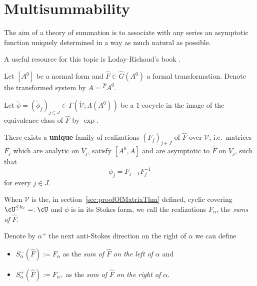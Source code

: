 \chapter{Multisummability}\label{chap:multisummability}
\begin{comment}
  \cite[Sec.III.2]{Loday2014},
  \cite[Chap.6]{Loday2014} and
  \cite[Chap.8]{Loday2014}
\end{comment}
The aim of a theory of summation is  to associate with any series an asymptotic
function uniquely determined in a way as much natural as possible.

A useful resource for this topic is Loday-Richaud's book \cite{Loday2014}.

Let $[A^0]$ be a normal form and $\hat F\in\hat G(A^0)$ a formal
transformation. Denote the transformed system by $A={}^{\hat F}\!A^0$.

Let $\dot\phi=(\dot\phi_j)_{j\in J}\in\Gamma(\dot{\mathcal{V}};\Lambda(A^0))$
be a $1$-cocycle in the image of the equivalence class of $\hat F$ by $\exp$.
\begin{prop}\label{prop:multisummability}
  There exists a \textbf{unique} family of realizations $(F_j)_{j\in J}$ of
  $\hat F$ over $\mathcal{V}$, i.e.\ matrices $F_j$ which are analytic on
  $V_j$, satisfy $[A^0,A]$ and are asymptotic to $\hat F$ on $V_j$, such that
  \[
    \dot\phi_j=F_{j-1}F_j^{-1}
  \]
  for every $j\in J$.
\end{prop}
When $\mathcal{V}$ is the, in section~\ref{sec:proofOfMatrixThm} defined,
cyclic covering $\cU^{\leq k_r}=:\cU$ and $\dot\phi$ is in its Stokes 
form\TODO[~(cf.~??)], we call the realizations $F_{\alpha}$, the
\emph{sums of $\hat F$}.
\begin{defn}\label{defn:sumsLeftRight}
  Denote by $\alpha^+$ the next anti-Stokes direction on the right of $\alpha$
  we can define
  \begin{itemize}
    \item $S_\alpha^-(\hat F):=F_\alpha$ as the \emph{sum of $\hat F$ on the
      left of $\alpha$} and
    \item $S_\alpha^+(\hat F):=F_{\alpha^+}$ as the \emph{sum of $\hat F$ on
      the right of $\alpha$}.
  \end{itemize}
\end{defn}

